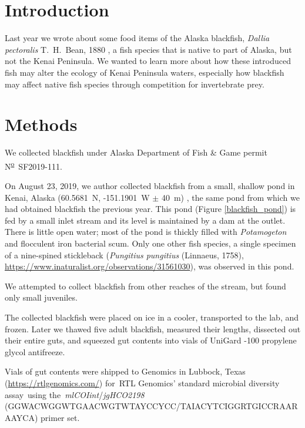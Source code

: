 \begin{multicols}{2}   

\section{Introduction}

Last year we  wrote about some food items of the Alaska blackfish, \textit{Dallia pectoralis} T.\ H.\ Bean, 1880 \citep{Bowseretal2019},  a fish species that is native to part of Alaska, but not the Kenai Peninsula. We wanted to learn more about how these introduced fish may alter the ecology of Kenai Peninsula waters, especially how blackfish may affect native fish species through competition for invertebrate prey.

\section{Methods}

We collected blackfish under Alaska Department of Fish \& Game permit N\textsuperscript{\underline{o}}\ SF2019-111.

On August 23, 2019, we author collected blackfish from a small, shallow pond in Kenai, Alaska (60.5681~\textdegree{}N, -151.1901~\textdegree{}W $\pm$ 40~m) \citep{bowser2019}, the same pond from which we had obtained blackfish the previous year. This pond (Figure \ref{blackfish_pond}) is fed by a small inlet stream and its level is maintained by a dam at the outlet. There is little open water; most of the pond is thickly filled with \textit{Potamogeton} and flocculent iron bacterial scum. Only one other fish species, a single specimen of a nine-spined stickleback (\textit{Pungitius pungitius} (Linnaeus, 1758),  
\url{https://www.inaturalist.org/observations/31561030}), was observed in this pond.

We attempted to collect blackfish from other reaches of the stream, but found only small juveniles. 

The collected blackfish were placed on ice in a cooler, transported to the lab, and frozen. Later we thawed five adult blackfish, measured their lengths, dissected out their entire guts, and squeezed gut contents into vials of UniGard -100 propylene glycol antifreeze.

Vials of gut contents were shipped to  Genomics in Lubbock, Texas (\url{https://rtlgenomics.com/}) for RTL Genomics' standard microbial diversity assay using the \textit{mlCOIint}/\textit{jgHCO2198} (GGWACWGGWTGAACWGTWTAYCCYCC/TAIACYTCIGGRTGICCRAARAAYCA) primer set.


\end{multicols}
